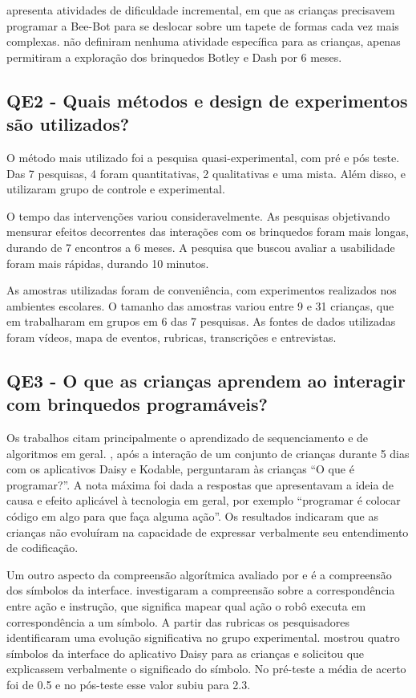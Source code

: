 { apresenta atividades de dificuldade incremental, em que as crianças precisavem programar a Bee-Bot para se deslocar sobre um tapete de formas cada vez mais complexas.  não definiram nenhuma atividade específica para as crianças, apenas permitiram a exploração dos brinquedos Botley e Dash por 6 meses.

\subsection{QE2 - Quais métodos e design de experimentos são utilizados?}

O método mais utilizado foi a pesquisa quasi-experimental, com pré e pós teste. Das 7 pesquisas, 4 foram quantitativas, 2 qualitativas e uma mista. Além disso,  e  utilizaram grupo de controle e experimental.

O tempo das intervenções variou consideravelmente. As pesquisas objetivando mensurar efeitos decorrentes das interações com os brinquedos foram mais longas, durando de 7 encontros a 6 meses. A pesquisa que buscou avaliar a usabilidade foram mais rápidas, durando 10 minutos.

As amostras utilizadas foram de conveniência, com experimentos realizados nos ambientes escolares. O tamanho das amostras variou entre 9 e 31 crianças, que em trabalharam em grupos em 6 das 7 pesquisas. As fontes de dados utilizadas foram vídeos, mapa de eventos, rubricas, transcrições e entrevistas. 

\subsection{QE3 - O que as crianças aprendem ao interagir com brinquedos programáveis?}

Os trabalhos citam principalmente o aprendizado de sequenciamento e de algoritmos em geral. , após a interação de um conjunto de crianças durante 5 dias com os aplicativos Daisy e Kodable, perguntaram às crianças “O que é programar?”. A nota máxima foi dada a respostas que apresentavam a ideia de causa e efeito aplicável à tecnologia em geral, por exemplo “programar é colocar código em algo para que faça alguma ação”. Os resultados indicaram que as crianças não evoluíram na capacidade de expressar verbalmente seu entendimento de codificação.

Um outro aspecto da compreensão algorítmica avaliado por  e  é a compreensão dos símbolos da interface.  investigaram a compreensão sobre a correspondência entre ação e instrução, que significa mapear qual ação o robô executa em correspondência a um símbolo. A partir das rubricas os pesquisadores identificaram uma evolução significativa no grupo experimental.  mostrou quatro símbolos da interface do aplicativo Daisy para as crianças e solicitou que explicassem verbalmente o significado do símbolo. No pré-teste a média de acerto foi de 0.5 e no pós-teste esse valor subiu para 2.3.

}
